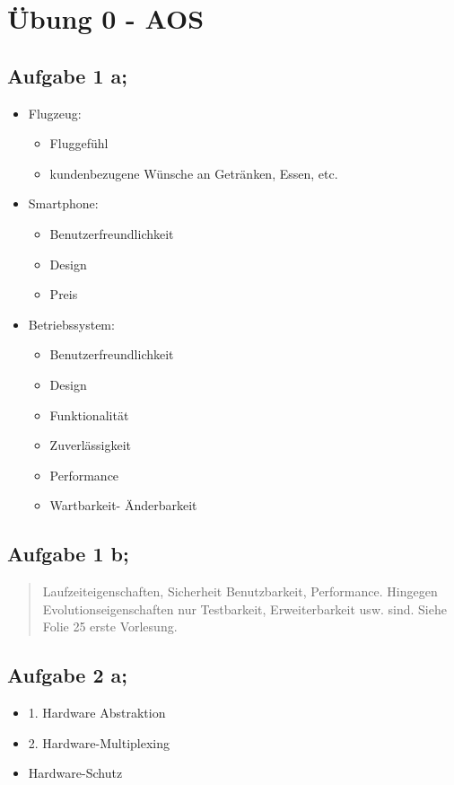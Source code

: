 \section{Übung 0 - AOS}


\subsection{Aufgabe 1 a;}
\begin{itemize}
    \item Flugzeug: 
    \begin{itemize}
        \item Fluggefühl
        \item kundenbezugene Wünsche an Getränken, Essen, etc.
    \end{itemize}
    \item Smartphone:
    \begin{itemize}
        \item Benutzerfreundlichkeit
        \item Design
        \item Preis
    \end{itemize}
    \item Betriebssystem:
    \begin{itemize}
        \item Benutzerfreundlichkeit
        \item Design
        \item Funktionalität
        \item Zuverlässigkeit
        \item Performance
        \item Wartbarkeit- Änderbarkeit
    \end{itemize}
\end{itemize}

\subsection{Aufgabe 1 b;}
    \begin{abstract}
       Laufzeiteigenschaften, Sicherheit Benutzbarkeit, Performance. Hingegen Evolutionseigenschaften nur Testbarkeit, Erweiterbarkeit usw. sind. Siehe Folie 25
        erste Vorlesung.
    \end{abstract}

\subsection{Aufgabe 2 a;}
    \begin{itemize}
        \item 1. Hardware Abstraktion
        \item 2. Hardware-Multiplexing
        \item Hardware-Schutz
    \end{itemize}

